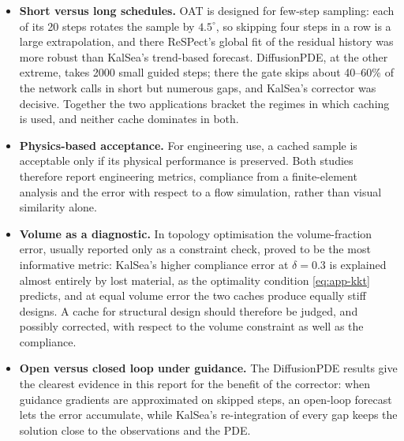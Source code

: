 \begin{itemize}
  \item \textbf{Short versus long schedules.} OAT is designed for few-step sampling: each of its 20 steps rotates the sample by $4.5^\circ$, so skipping four steps in a row is a large extrapolation, and there ReSPect's global fit of the residual history was more robust than KalSea's trend-based forecast. DiffusionPDE, at the other extreme, takes 2000 small guided steps; there the gate skips about 40--60\% of the network calls in short but numerous gaps, and KalSea's corrector was decisive. Together the two applications bracket the regimes in which caching is used, and neither cache dominates in both.
  \item \textbf{Physics-based acceptance.} For engineering use, a cached sample is acceptable only if its physical performance is preserved. Both studies therefore report engineering metrics, compliance from a finite-element analysis and the error with respect to a flow simulation, rather than visual similarity alone.
  \item \textbf{Volume as a diagnostic.} In topology optimisation the volume-fraction error, usually reported only as a constraint check, proved to be the most informative metric: KalSea's higher compliance error at $\delta=0.3$ is explained almost entirely by lost material, as the optimality condition \cref{eq:app-kkt} predicts, and at equal volume error the two caches produce equally stiff designs. A cache for structural design should therefore be judged, and possibly corrected, with respect to the volume constraint as well as the compliance.
  \item \textbf{Open versus closed loop under guidance.} The DiffusionPDE results give the clearest evidence in this report for the benefit of the corrector: when guidance gradients are approximated on skipped steps, an open-loop forecast lets the error accumulate, while KalSea's re-integration of every gap keeps the solution close to the observations and the PDE.
\end{itemize}
